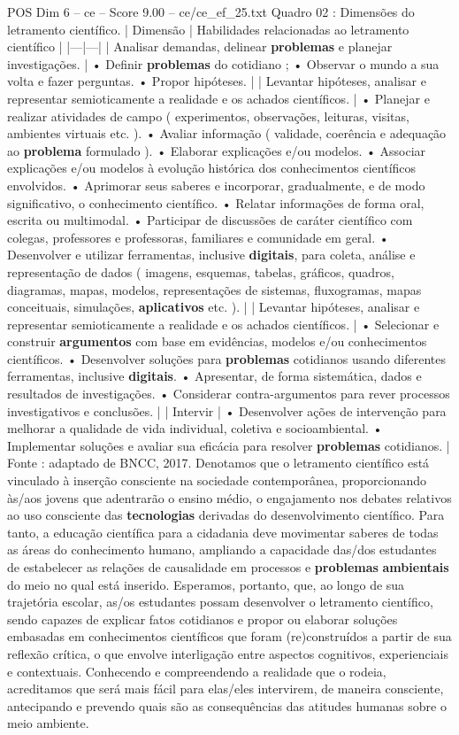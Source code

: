 \begin{textsample}{POS Dim 6 – ce – Score 9.00 – ce/ce\_ef\_25.txt}
Quadro 02 : Dimensões do letramento científico. | Dimensão | Habilidades relacionadas ao letramento científico | |---|---| | Analisar demandas, delinear \textbf{problemas} e planejar investigações. | • Definir \textbf{problemas} do cotidiano ; • Observar o mundo a sua volta e fazer perguntas. • Propor hipóteses. | | Levantar hipóteses, analisar e representar semioticamente a realidade e os achados científicos. | • Planejar e realizar atividades de campo ( experimentos, observações, leituras, visitas, ambientes virtuais etc. ). • Avaliar informação ( validade, coerência e adequação ao \textbf{problema} formulado ). • Elaborar explicações e/ou modelos. • Associar explicações e/ou modelos à evolução histórica dos conhecimentos científicos envolvidos. • Aprimorar seus saberes e incorporar, gradualmente, e de modo significativo, o conhecimento científico. • Relatar informações de forma oral, escrita ou multimodal. • Participar de discussões de caráter científico com colegas, professores e professoras, familiares e comunidade em geral. • Desenvolver e utilizar ferramentas, inclusive \textbf{digitais}, para coleta, análise e representação de dados ( imagens, esquemas, tabelas, gráficos, quadros, diagramas, mapas, modelos, representações de sistemas, fluxogramas, mapas conceituais, simulações, \textbf{aplicativos} etc. ). | | Levantar hipóteses, analisar e representar semioticamente a realidade e os achados científicos. | • Selecionar e construir \textbf{argumentos} com base em evidências, modelos e/ou conhecimentos científicos. • Desenvolver soluções para \textbf{problemas} cotidianos usando diferentes ferramentas, inclusive \textbf{digitais}. • Apresentar, de forma sistemática, dados e resultados de investigações. • Considerar contra-argumentos para rever processos investigativos e conclusões. | | Intervir | • Desenvolver ações de intervenção para melhorar a qualidade de vida individual, coletiva e socioambiental. • Implementar soluções e avaliar sua eficácia para resolver \textbf{problemas} cotidianos. | Fonte : adaptado de BNCC, 2017.
Denotamos que o letramento científico está vinculado à inserção consciente na sociedade contemporânea, proporcionando às/aos jovens que adentrarão o ensino médio, o engajamento nos debates relativos ao uso consciente das \textbf{tecnologias} derivadas do desenvolvimento científico.
Para tanto, a educação científica para a cidadania deve movimentar saberes de todas as áreas do conhecimento humano, ampliando a capacidade das/dos estudantes de estabelecer as relações de causalidade em processos e \textbf{problemas} \textbf{ambientais} do meio no qual está inserido.
Esperamos, portanto, que, ao longo de sua trajetória escolar, as/os estudantes possam desenvolver o letramento científico, sendo capazes de explicar fatos cotidianos e propor ou elaborar soluções embasadas em conhecimentos científicos que foram (re)construídos a partir de sua reflexão crítica, o que envolve interligação entre aspectos cognitivos, experienciais e contextuais.
Conhecendo e compreendendo a realidade que o rodeia, acreditamos que será mais fácil para elas/eles intervirem, de maneira consciente, antecipando e prevendo quais são as consequências das atitudes humanas sobre o meio ambiente.


\end{textsample}
